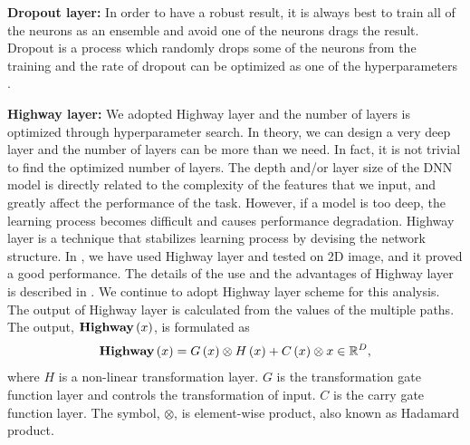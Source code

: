 \documentclass[proof]{pasj01}
\begin{document}
{\bf Dropout layer:}
In order to have a robust result, it is always best to train all of the neurons as an ensemble and avoid one of the neurons drags the result.  Dropout is a process which randomly drops some of the neurons from the training and the rate of dropout can be optimized as one of the hyperparameters \citep{dropout}. 

{\bf Highway layer:}
We adopted Highway layer \citep{srivastava15a} and the number of layers is optimized through hyperparameter search.   In theory, we can design a very deep layer and the number of layers can be more than we need.   In fact, it is not trivial to find the optimized number of layers.   
The depth and/or layer size of the DNN model is directly related to the complexity of the features that we input, and greatly affect the performance of the task.  
However, if a model is too deep, the learning process becomes difficult and causes performance degradation.
Highway layer is a technique that stabilizes learning process by devising the network structure.
In \citet{Kimura17}, we have used Highway layer and tested on 2D image, and it proved a good performance.  The details of the use and the advantages of Highway layer is described in \citet{Kimura17}.  We continue to adopt Highway layer scheme for this analysis.
The output of Highway layer is calculated from the values of the multiple paths.
The output, ${\bf Highway} \left(x\right)$, is formulated as
\begin{equation}
    {\bf Highway} \left(x\right) = G \left(x\right) \otimes H \left(x\right) + C \left(x\right) \otimes x \in \mathbb{R}^D,
\end{equation}
where $H$ is a non-linear transformation layer. $G$ is the transformation gate function layer and controls the transformation of input.  $C$ is the carry gate function layer. The symbol, $\otimes$, is element-wise product, also known as Hadamard product.
\end{document}
